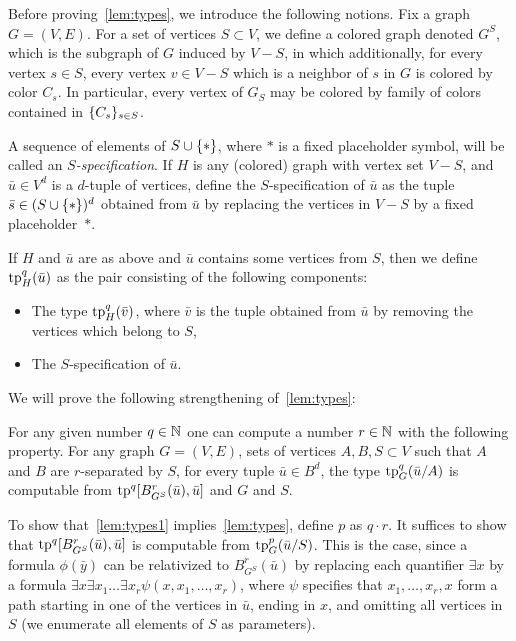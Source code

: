 Before proving~\cref{lem:types}, we introduce the following notions.
Fix a graph $G=(V,E)$.
For a set of vertices $S\subset V$,
we define a colored graph denoted $G^S$, which is 
the subgraph of $G$ induced by $V-S$,
in which additionally, for every vertex $s\in S$, every vertex $v\in V-S$ which is a neighbor of  $s$ in $G$ is colored by color $C_s$. In particular, every vertex of $G_S$
may be colored by family of colors contained in $\{C_s\}_{s\in S}$.

A sequence of elements of $S\cup\{\ast\}$,
where $\ast$ is a fixed placeholder symbol,
will be called an \emph{$S$-specification}.
If $H$ is any (colored) graph with vertex set $V-S$,
and $\bar u\in V^d$ is a $d$-tuple of vertices,
define the {$S$-specification} of $\bar u$
as the tuple $\bar s\in (S\cup\{\ast\})^d$ obtained from $\bar u$ by replacing the vertices in $V-S$ by a fixed placeholder~$\ast$.


If $H$ and $\bar u$ are as above and $\bar u$ contains some vertices from $S$,
then we define $\mathrm{tp}^q_H(\bar u)$ as the
pair consisting of the following components:
\begin{itemize}
	\item The type $\mathrm{tp}^q_H(\bar v)$,
	where $\bar v$ is the tuple obtained from $\bar u$
	by removing the vertices which belong to $S$,
	\item The $S$-specification of $\bar u$.
\end{itemize}

We will prove the following strengthening of~\cref{lem:types}:

\begin{lemma}\label{lem:types1}
For any given number $q\in\mathbb{N}$ one can compute 
 a number $r\in\mathbb{N}$ with the following property.
	For any graph $G=(V,E)$, sets of vertices $A,B,S\subset V$	
	such that $A$  and $B$ are $r$-separated by $S$,
	for every tuple $\bar u\in B^{d}$, 
	the type $\mathrm{tp}^q_G(\bar u/A)$
	is computable from  $\mathrm{tp}^{q}[B^r_{G^S}(\bar u), \bar u]$ and $G$ and $S$.  
\end{lemma}

To show that~\cref{lem:types1} implies~\cref{lem:types}, define $p$ as $q\cdot r$. It suffices to show that
$\mathrm{tp}^{q}[B^r_{G^S}(\bar u), \bar u]$ is computable from $\mathrm{tp}_G^p(\bar u/S)$. This is the case, since
a formula $\phi(\bar y)$
can be relativized to $B^r_{G^S}(\bar u)$
by replacing each quantifier $\exists x$ by a formula
$\exists x\exists x_1\ldots\exists x_r\psi (x,x_1,\ldots,x_r)$,
where $\psi$ specifies that $x_1,\ldots,x_r,x$ form a path
starting in one of the vertices in $\bar u$, ending in $x$,
and omitting all vertices in $S$ (we enumerate all elements of $S$ as parameters).

